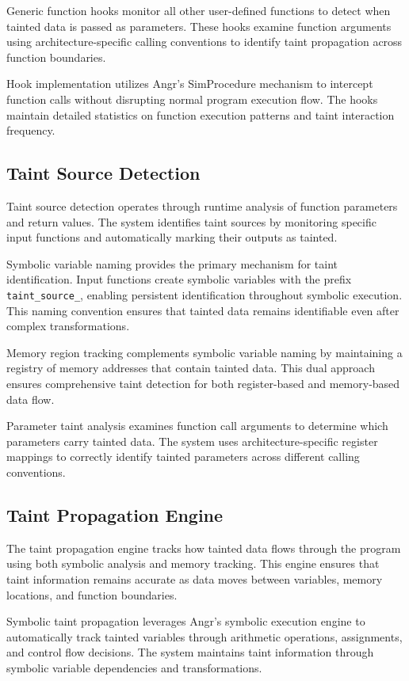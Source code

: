 Generic function hooks monitor all other user-defined functions to detect when tainted data is passed as parameters. These hooks examine function arguments using architecture-specific calling conventions to identify taint propagation across function boundaries.

Hook implementation utilizes Angr's SimProcedure mechanism to intercept function calls without disrupting normal program execution flow. The hooks maintain detailed statistics on function execution patterns and taint interaction frequency.

\subsection{Taint Source Detection}

Taint source detection operates through runtime analysis of function parameters and return values. The system identifies taint sources by monitoring specific input functions and automatically marking their outputs as tainted.

Symbolic variable naming provides the primary mechanism for taint identification. Input functions create symbolic variables with the prefix \texttt{taint\_source\_}, enabling persistent identification throughout symbolic execution. This naming convention ensures that tainted data remains identifiable even after complex transformations.

Memory region tracking complements symbolic variable naming by maintaining a registry of memory addresses that contain tainted data. This dual approach ensures comprehensive taint detection for both register-based and memory-based data flow.

Parameter taint analysis examines function call arguments to determine which parameters carry tainted data. The system uses architecture-specific register mappings to correctly identify tainted parameters across different calling conventions.

\subsection{Taint Propagation Engine}

The taint propagation engine tracks how tainted data flows through the program using both symbolic analysis and memory tracking. This engine ensures that taint information remains accurate as data moves between variables, memory locations, and function boundaries.

Symbolic taint propagation leverages Angr's symbolic execution engine to automatically track tainted variables through arithmetic operations, assignments, and control flow decisions. The system maintains taint information through symbolic variable dependencies and transformations.

